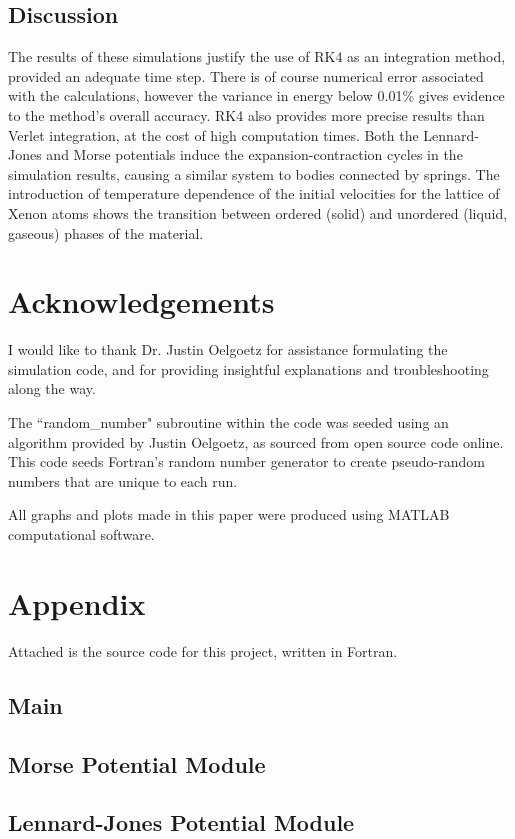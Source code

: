 \documentclass[12pt]{article}
\begin{document}
\subsection*{Discussion}
The results of these simulations justify the use of RK4 as an integration method, provided an adequate time step.  There is of course numerical error associated with the calculations, however the variance in energy below 0.01\% gives evidence to the method's overall accuracy.  RK4 also provides more precise results than Verlet integration, at the cost of high computation times. \cite{me}  Both the Lennard-Jones and Morse potentials induce the expansion-contraction cycles in the simulation results, causing a similar system to bodies connected by springs. \cite{mpotential,ljpotential} The introduction of temperature dependence of the initial velocities for the lattice of Xenon atoms shows the transition between ordered (solid) and unordered (liquid, gaseous) phases of the material.
\newpage
\section*{Acknowledgements}
I would like to thank Dr. Justin Oelgoetz for assistance formulating the simulation code, and for providing insightful explanations and troubleshooting along the way.

The ``random\_number" subroutine within the code was seeded using an algorithm provided by Justin Oelgoetz, as sourced from open source code online.  This code seeds Fortran's random number generator to create pseudo-random numbers that are unique to each run.

All graphs and plots made in this paper were produced using MATLAB computational software.
\newpage


\newpage
\section*{Appendix}
Attached is the source code for this project, written in Fortran.
\subsection*{Main}

\subsection*{Morse Potential Module}

\subsection*{Lennard-Jones Potential Module}

\end{document}
